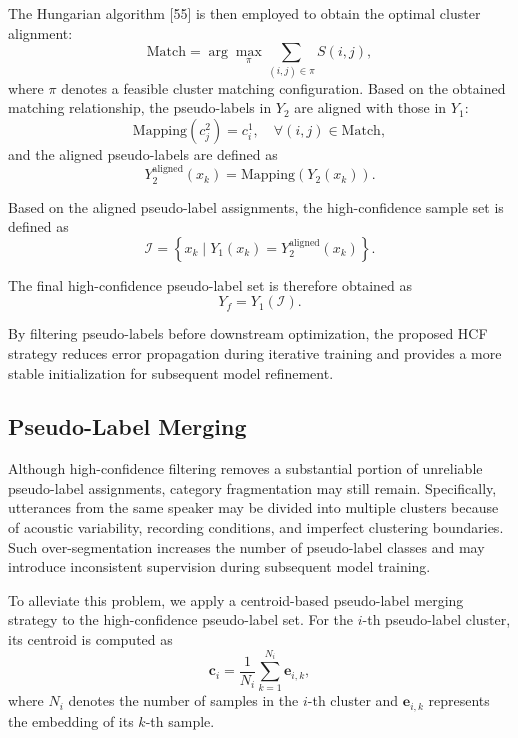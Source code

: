 \documentclass[lettersize,journal]{IEEEtran}
\begin{document}
The Hungarian algorithm [55] is then employed to obtain the optimal cluster alignment:
\begin{equation}
\mathrm{Match}
=
\arg\max_{\pi}
\sum_{(i,j)\in\pi}
S(i,j),
\end{equation}
where $\pi$ denotes a feasible cluster matching configuration. Based on the obtained matching relationship, the pseudo-labels in $Y_2$ are aligned with those in $Y_1$:
\begin{equation}
\mathrm{Mapping}(c_j^2)=c_i^1,
\quad
\forall(i,j)\in\mathrm{Match},
\end{equation}
and the aligned pseudo-labels are defined as
\begin{equation}
Y_2^{\mathrm{aligned}}(x_k)
=
\mathrm{Mapping}(Y_2(x_k)).
\end{equation}

Based on the aligned pseudo-label assignments, the high-confidence sample set is defined as
\begin{equation}
\mathcal{I}
=
\left\{
x_k
\mid
Y_1(x_k)
=
Y_2^{\mathrm{aligned}}(x_k)
\right\}.
\end{equation}

The final high-confidence pseudo-label set is therefore obtained as
\begin{equation}
Y_f
=
Y_1(\mathcal{I}).
\end{equation}

By filtering pseudo-labels before downstream optimization, the proposed HCF strategy reduces error propagation during iterative training and provides a more stable initialization for subsequent model refinement.

\subsection{Pseudo-Label Merging}

Although high-confidence filtering removes a substantial portion of
unreliable pseudo-label assignments, category fragmentation may still
remain. Specifically, utterances from the same speaker may be divided
into multiple clusters because of acoustic variability, recording
conditions, and imperfect clustering boundaries. Such over-segmentation
increases the number of pseudo-label classes and may introduce
inconsistent supervision during subsequent model training.

To alleviate this problem, we apply a centroid-based pseudo-label
merging strategy to the high-confidence pseudo-label set. For the
$i$-th pseudo-label cluster, its centroid is computed as
\begin{equation}
\mathbf{c}_i
=
\frac{1}{N_i}
\sum_{k=1}^{N_i}
\mathbf{e}_{i,k},
\end{equation}
where $N_i$ denotes the number of samples in the $i$-th cluster and
$\mathbf{e}_{i,k}$ represents the embedding of its $k$-th sample.
\end{document}
